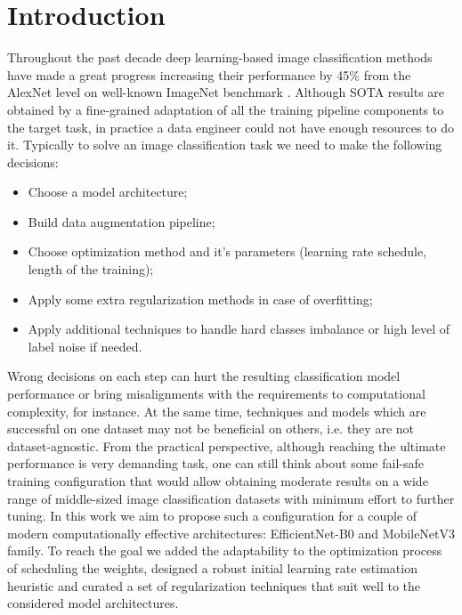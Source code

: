 \documentclass[runningheads]{llncs}
\begin{document}
\section{Introduction}

Throughout the past decade deep learning-based image classification methods have made
a great progress increasing their performance by 45\%\cite{zhai2021scaling} from the AlexNet\cite{alexnet}
level on well-known ImageNet benchmark \cite{imagenet_cvpr09}.
Although SOTA results are obtained by a fine-grained adaptation of all the training pipeline components to
the target task, in practice a data engineer could not have enough resources to do it.
Typically to solve an image classification task we need to make the following decisions:
\begin{itemize}
  \item Choose a model architecture;
  \item Build data augmentation pipeline;
  \item Choose optimization method and it's parameters (learning rate schedule, length of the training);
  \item Apply some extra regularization methods in case of overfitting;
  \item Apply additional techniques to handle hard classes
  imbalance or high level of label noise if needed.
\end{itemize}
Wrong decisions on each step can hurt the resulting classification model performance or bring misalignments
with the requirements to computational complexity, for instance.
At the same time, techniques and models which are successful on one dataset may not be
beneficial on others, i.e. they are not dataset-agnostic. From the practical perspective, although reaching the ultimate performance is
very demanding task, one can still think about some fail-safe training configuration
that would allow obtaining moderate results on a wide range of middle-sized image classification datasets
with minimum effort to further tuning. In this work we aim to propose such a configuration for a couple of
modern computationally effective architectures: EfficientNet-B0 \cite{Tan2019EfficientNetRM} and MobileNetV3\cite{Howard2019SearchingFM} family.
To reach the goal we added the adaptability to the optimization process of scheduling the weights,
designed a robust initial learning rate estimation heuristic and curated a set of
regularization techniques that suit well to the considered model architectures.
\end{document}
